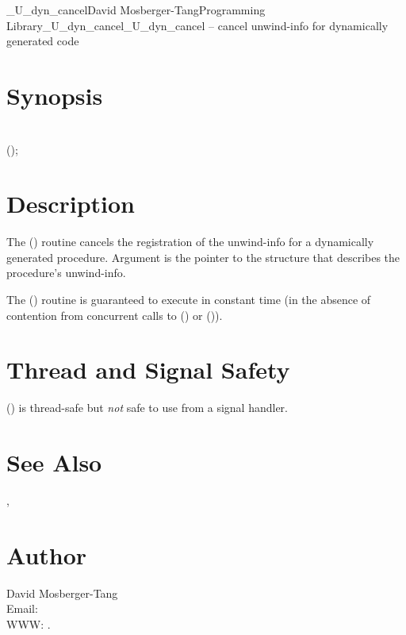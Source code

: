 \documentclass{article}
\begin{document}
\begin{Name}{3}{\_U\_dyn\_cancel}{David Mosberger-Tang}{Programming Library}{\_U\_dyn\_cancel}\_U\_dyn\_cancel -- cancel unwind-info for dynamically generated code
\end{Name}

\section{Synopsis}

\\

 ();\\

\section{Description}

The () routine cancels the registration of the
unwind-info for a dynamically generated procedure.  Argument 
is the pointer to the  structure that
describes the procedure's unwind-info.

The () routine is guaranteed to execute in
constant time (in the absence of contention from concurrent calls to
() or ()).


\section{Thread and Signal Safety}

() is thread-safe but \emph{not} safe to use
from a signal handler.

\section{See Also}

, 

\section{Author}

\noindent
David Mosberger-Tang\\
Email: \\
WWW: .
\LatexManEnd
\end{document}
